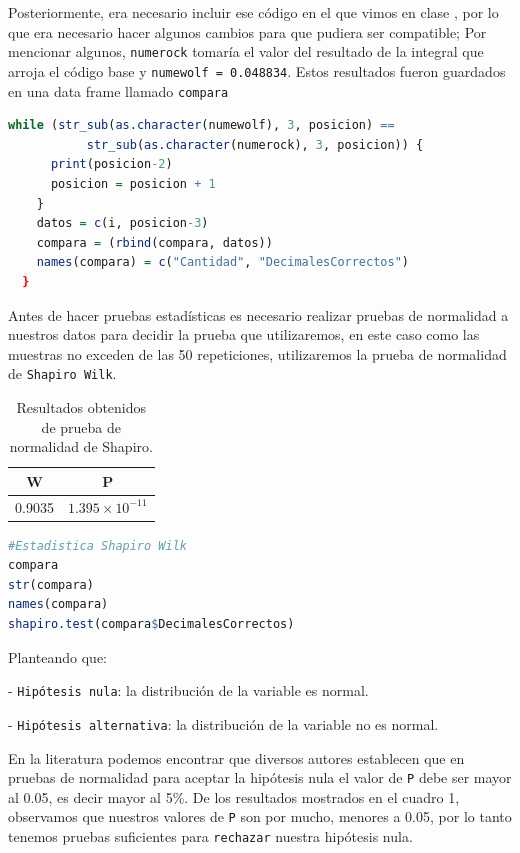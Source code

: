 \documentclass{article}
\begin{document}
Posteriormente, era necesario incluir ese c\'odigo en el que vimos en clase \cite{Cbase}, por lo que era necesario hacer algunos cambios para que pudiera ser compatible; Por mencionar algunos, \texttt{numerock} tomar\'ia el valor del resultado de la integral que arroja el c\'odigo base y \texttt{numewolf = 0.048834}. Estos resultados fueron guardados en una data frame llamado \texttt{compara}

\begin{lstlisting}[language=R, caption= C\'odigo data frame \texttt{compara}.]
while (str_sub(as.character(numewolf), 3, posicion) == 
           str_sub(as.character(numerock), 3, posicion)) {
      print(posicion-2)
      posicion = posicion + 1
    }
    datos = c(i, posicion-3)
    compara = (rbind(compara, datos))
    names(compara) = c("Cantidad", "DecimalesCorrectos")
  }
\end{lstlisting}

Antes de hacer pruebas estad\'isticas es necesario realizar pruebas de normalidad a nuestros datos para decidir la prueba que utilizaremos, en este caso como las muestras no exceden de las 50 repeticiones, utilizaremos la prueba de normalidad de \texttt{Shapiro Wilk}.

\begin{table}[ht]
    \centering
    \caption{Resultados obtenidos de prueba de normalidad de Shapiro.} 
    \begin{tabular}{|c|c|}
    \hline
    W & P  \\
    \hline
    0.9035 & $1.395\times 10^{-11}$ \\
    \hline 
\end{tabular}
    \label{cuadro 1}
\end{table}

\begin{lstlisting}[language=R, caption= C\'odigo prueba de normalidad Shapiro-Wilk.]
#Estadistica Shapiro Wilk
compara
str(compara)
names(compara)
shapiro.test(compara$DecimalesCorrectos)
\end{lstlisting}
Planteando que:


- \texttt{Hip\'otesis nula}: la distribuci\'on de la variable es normal.

- \texttt{Hip\'otesis alternativa}: la distribuci\'on de la variable no es normal.

En la literatura podemos encontrar que diversos autores establecen que en pruebas de normalidad para aceptar la hip\'otesis nula el valor de \texttt{P} debe ser mayor al 0.05, es decir mayor al 5\%. De los resultados mostrados en el cuadro 1, observamos que nuestros valores de \texttt{P} son por mucho, menores a 0.05, por lo tanto tenemos pruebas suficientes para \texttt{rechazar} nuestra hip\'otesis nula.
\end{document}
